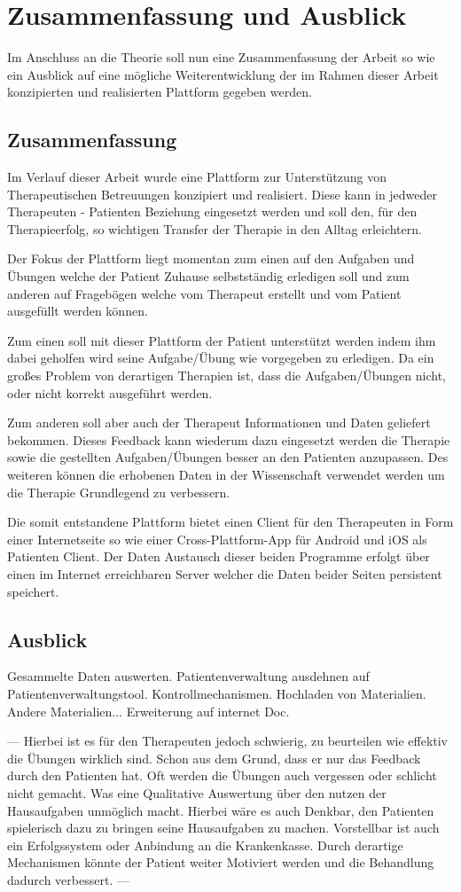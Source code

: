 \chapter{Zusammenfassung und Ausblick} \label{_ZusammenfassungundAusblick}
Im Anschluss an die Theorie soll nun eine Zusammenfassung der Arbeit so wie ein Ausblick auf eine mögliche Weiterentwicklung der im Rahmen dieser Arbeit konzipierten und realisierten Plattform gegeben werden. 
\section{Zusammenfassung}
Im Verlauf dieser Arbeit wurde eine Plattform zur Unterstützung von Therapeutischen Betreuungen konzipiert und realisiert. Diese kann in jedweder Therapeuten - Patienten Beziehung eingesetzt werden und soll den, für den Therapieerfolg, so wichtigen Transfer der Therapie in den Alltag erleichtern.

Der Fokus der Plattform liegt momentan zum einen auf den Aufgaben und Übungen welche der Patient Zuhause selbstständig erledigen soll und zum anderen auf Fragebögen welche vom Therapeut erstellt und vom Patient ausgefüllt werden können.

Zum einen soll mit dieser Plattform der Patient unterstützt werden indem ihm dabei geholfen wird seine Aufgabe/Übung wie vorgegeben zu erledigen. Da ein großes Problem von derartigen Therapien ist, dass die Aufgaben/Übungen nicht, oder nicht korrekt ausgeführt werden.

Zum anderen soll aber auch der Therapeut Informationen und Daten geliefert bekommen. Dieses Feedback kann wiederum dazu eingesetzt werden die Therapie sowie die gestellten Aufgaben/Übungen besser an den Patienten anzupassen. Des weiteren können die erhobenen Daten in der Wissenschaft verwendet werden um die Therapie Grundlegend zu verbessern.

Die somit entstandene Plattform bietet einen Client für den Therapeuten in Form einer Internetseite so wie einer Cross-Plattform-App für Android und iOS als Patienten Client. Der Daten Austausch dieser beiden Programme erfolgt über einen im Internet erreichbaren Server welcher die Daten beider Seiten persistent speichert.

 
\section{Ausblick}
Gesammelte Daten auswerten.
Patientenverwaltung ausdehnen auf Patientenverwaltungstool.
Kontrollmechanismen.
Hochladen von Materialien.
Andere Materialien...
Erweiterung auf internet Doc.



---
 Hierbei ist es für den Therapeuten jedoch schwierig, zu beurteilen wie effektiv die Übungen wirklich sind. Schon aus dem Grund, dass er nur das Feedback durch den Patienten hat. Oft werden die Übungen auch vergessen oder schlicht nicht gemacht. Was eine Qualitative Auswertung über den nutzen der Hausaufgaben unmöglich macht.  Hierbei wäre es auch Denkbar, den Patienten spielerisch dazu zu bringen seine Hausaufgaben zu machen. Vorstellbar ist auch ein Erfolgssystem oder Anbindung an die Krankenkasse. Durch derartige Mechanismen könnte der Patient weiter Motiviert werden und die Behandlung dadurch verbessert. 
 ---